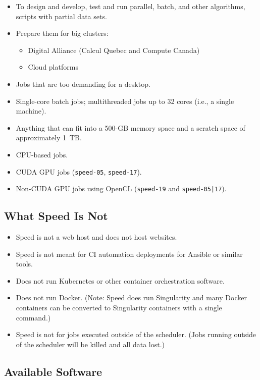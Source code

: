 \documentclass{easychair}
\begin{document}
\begin{itemize}
\item
To design and develop, test and run parallel, batch, and other algorithms, scripts with partial data sets.
\item
Prepare them for big clusters:
	\begin{itemize}
	\item 
	Digital Alliance (Calcul Quebec and Compute Canada)
	\item 
	Cloud platforms
	\end{itemize}
\item
Jobs that are too demanding for a desktop. 
\item
Single-core batch jobs; multithreaded jobs up to 32 cores (i.e., a single machine).
\item
Anything that can fit into a 500-GB memory space and a scratch space of approximately 1~TB. 
\item
CPU-based jobs. 
\item
CUDA GPU jobs (\texttt{speed-05}, \texttt{speed-17}).
\item
Non-CUDA GPU jobs using OpenCL (\texttt{speed-19} and \texttt{speed-05|17}).
\end{itemize}

\subsection{What Speed Is Not}
\label{sect:speed-is-not}

\begin{itemize}
\item Speed is not a web host and does not host websites.
\item Speed is not meant for CI automation deployments for Ansible or similar tools. 
\item Does not run Kubernetes or other container orchestration software.
\item Does not run Docker. (Note: Speed does run Singularity and many Docker containers can be converted to Singularity containers with a single command.)
\item Speed is not for jobs executed outside of the scheduler. (Jobs running outside of the scheduler will be killed and all data lost.)
\end{itemize}

\subsection{Available Software}
\end{document}

